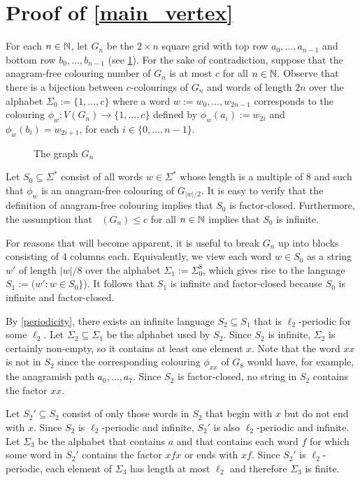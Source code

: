 \documentclass{patmorin}
\DeclareMathOperator{\afcn}{\dot{\chi}_\pi}
\begin{document}
\section{Proof of \cref{main_vertex}}
\label{vertex_colourings}

For each $n\in\mathbb{N}$, let $G_n$ be the $2\times n$ square grid with top row $a_0,\ldots,a_{n-1}$ and bottom row $b_0,\ldots,b_{n-1}$ (see \cref{g_n}).  For the sake of contradiction, suppose that the anagram-free colouring number of $G_n$ is at most $c$ for all $n\in\mathbb{N}$.  Observe that there is a bijection between $c$-colourings of $G_n$ and words of length $2n$ over the alphabet $\Sigma_0:=\{1,\ldots,c\}$ where a word $w:=w_0,\ldots,w_{2n-1}$ corresponds to the colouring $\phi_w:V(G_n)\to\{1,\ldots,c\}$ defined by
$\phi_w(a_i):=w_{2i}$ and $\phi_w(b_i)=w_{2i+1}$, for each $i\in\{0,\ldots,n-1\}$.

\begin{figure}
    \caption{The graph $G_n$}
    \label{g_n}
\end{figure}


Let $S_0\subseteq \Sigma^*$ consist of all words $w\in \Sigma^*$ whose length is a multiple of $8$ and such that $\phi_w$ is an anagram-free colouring of $G_{|w|/2}$.  It is easy to verify that the definition of anagram-free colouring implies that $S_0$ is factor-closed.  Furthermore, the assumption that $\afcn(G_n)\le c$ for all $n\in\mathbb{N}$ implies that $S_0$ is infinite.

For reasons that will become apparent, it is useful to break $G_n$ up into blocks consisting of $4$ columns each.  Equivalently, we view each word $w\in S_0$ as a string $w'$ of length $|w|/8$ over the alphabet $\Sigma_1:=\Sigma_0^8$, which gives rise to the language $S_1:=(w': w\in S_0\}$).  It follows that $S_1$ is infinite and factor-closed because $S_0$ is infinite and factor-closed.

By \cref{periodicity}, there exists an infinite language $S_2\subseteq S_1$ that is $\ell_2$-periodic for some $\ell_2$. Let $\Sigma_2\subseteq \Sigma_1$ be the alphabet used by $S_2$.  Since $S_2$ is infinite, $\Sigma_2$ is certainly non-empty, so it contains at least one element $x$.  Note that the word $xx$ is not in $S_2$ since the corresponding colouring $\phi_{xx}$ of $G_8$ would have, for example, the anagramish path $a_0,\ldots,a_7$.  Since $S_2$ is factor-closed, no string in $S_2$ contains the factor $xx$.

Let $S_2'\subseteq S_2$ consist of only those words in $S_2$ that begin with $x$ but do not end with $x$.  Since $S_2$ is $\ell_2$-periodic and infinite, $S_2'$ is also $\ell_2$-periodic and infinite.  Let $\Sigma_3$ be the alphabet that contains $a$ and that contains each word $f$ for which some word in $S_2'$ contains the factor $xfx$ or ends with $xf$.  Since $S_2'$ is $\ell_2$-periodic, each element of $\Sigma_3$ has length at most $\ell_2$ and therefore $\Sigma_3$ is finite.
\end{document}
